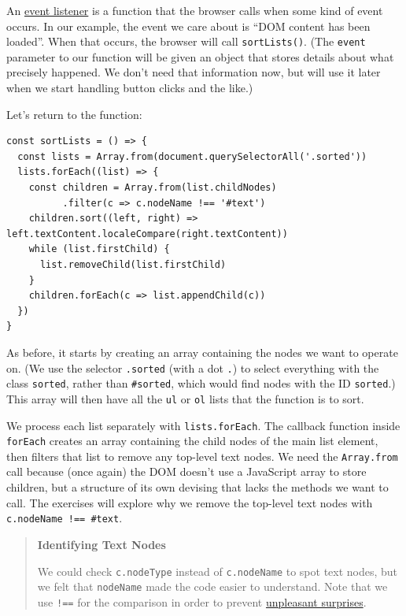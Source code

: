 An \protect\hyperlink{g:event-listener}{event listener} is a function
that the browser calls when some kind of event occurs. In our example,
the event we care about is ``DOM content has been loaded''. When that
occurs, the browser will call \texttt{sortLists()}. (The \texttt{event}
parameter to our function will be given an object that stores details
about what precisely happened. We don't need that information now, but
will use it later when we start handling button clicks and the like.)

Let's return to the function:

\begin{verbatim}
const sortLists = () => {
  const lists = Array.from(document.querySelectorAll('.sorted'))
  lists.forEach((list) => {
    const children = Array.from(list.childNodes)
          .filter(c => c.nodeName !== '#text')
    children.sort((left, right) => left.textContent.localeCompare(right.textContent))
    while (list.firstChild) {
      list.removeChild(list.firstChild)
    }
    children.forEach(c => list.appendChild(c))
  })
}
\end{verbatim}

As before, it starts by creating an array containing the nodes we want
to operate on. (We use the selector \texttt{.sorted} (with a dot
\texttt{.}) to select everything with the class \texttt{sorted}, rather
than \texttt{\#sorted}, which would find nodes with the ID
\texttt{sorted}.) This array will then have all the \texttt{ul} or
\texttt{ol} lists that the function is to sort.

We process each list separately with \texttt{lists.forEach}. The
callback function inside \texttt{forEach} creates an array containing
the child nodes of the main list element, then filters that list to
remove any top-level text nodes. We need the \texttt{Array.from} call
because (once again) the DOM doesn't use a JavaScript array to store
children, but a structure of its own devising that lacks the methods we
want to call. The exercises will explore why we remove the top-level
text nodes with
\texttt{c.nodeName\ !==\ \textquotesingle{}\#text\textquotesingle{}}.

\begin{quote}
\textbf{Identifying Text Nodes}

We could check \texttt{c.nodeType} instead of \texttt{c.nodeName} to
spot text nodes, but we felt that \texttt{nodeName} made the code easier
to understand. Note that we use \texttt{!==} for the comparison in order
to prevent \protect\hyperlink{s:legacy-equality}{unpleasant surprises}.
\end{quote}

